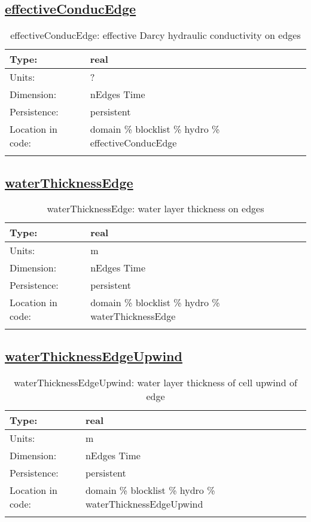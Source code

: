 \subsection[effectiveConducEdge]{\hyperref[sec:var_tab_hydro]{effectiveConducEdge}}
\label{subsec:var_sec_hydro_effectiveConducEdge}
\begin{center}
\begin{longtable}{| p{2.0in} | p{4.0in} |}
        \hline 
        Type: & real \\
        \hline 
        Units: & \si{?} \\
        \hline 
        Dimension: & nEdges Time \\
        \hline 
        Persistence: & persistent \\
        \hline 
         Location in code: & domain \% blocklist \% hydro \% effectiveConducEdge \\
         \hline 
    \caption{effectiveConducEdge: effective Darcy hydraulic conductivity on edges}
\end{longtable}
\end{center}
\subsection[waterThicknessEdge]{\hyperref[sec:var_tab_hydro]{waterThicknessEdge}}
\label{subsec:var_sec_hydro_waterThicknessEdge}
\begin{center}
\begin{longtable}{| p{2.0in} | p{4.0in} |}
        \hline 
        Type: & real \\
        \hline 
        Units: & \si{m} \\
        \hline 
        Dimension: & nEdges Time \\
        \hline 
        Persistence: & persistent \\
        \hline 
         Location in code: & domain \% blocklist \% hydro \% waterThicknessEdge \\
         \hline 
    \caption{waterThicknessEdge: water layer thickness on edges}
\end{longtable}
\end{center}
\subsection[waterThicknessEdgeUpwind]{\hyperref[sec:var_tab_hydro]{waterThicknessEdgeUpwind}}
\label{subsec:var_sec_hydro_waterThicknessEdgeUpwind}
\begin{center}
\begin{longtable}{| p{2.0in} | p{4.0in} |}
        \hline 
        Type: & real \\
        \hline 
        Units: & \si{m} \\
        \hline 
        Dimension: & nEdges Time \\
        \hline 
        Persistence: & persistent \\
        \hline 
         Location in code: & domain \% blocklist \% hydro \% waterThicknessEdgeUpwind \\
         \hline 
    \caption{waterThicknessEdgeUpwind: water layer thickness of cell upwind of edge}
\end{longtable}
\end{center}
